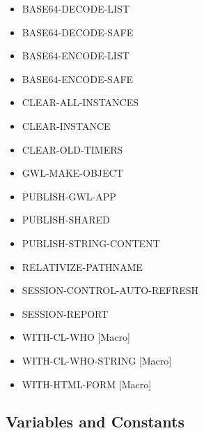 \documentclass [11pt]{book}
\begin{document}
\label{subsec:functionandmacrodefinitions}



\begin{itemize}

\item {}BASE64-DECODE-LIST

\item {}BASE64-DECODE-SAFE

\item {}BASE64-ENCODE-LIST

\item {}BASE64-ENCODE-SAFE

\item {}CLEAR-ALL-INSTANCES

\item {}CLEAR-INSTANCE

\item {}CLEAR-OLD-TIMERS

\item {}GWL-MAKE-OBJECT

\item {}PUBLISH-GWL-APP

\item {}PUBLISH-SHARED

\item {}PUBLISH-STRING-CONTENT

\item {}RELATIVIZE-PATHNAME

\item {}SESSION-CONTROL-AUTO-REFRESH

\item {}SESSION-REPORT

\item {}WITH-CL-WHO [Macro]

\item {}WITH-CL-WHO-STRING [Macro]

\item {}WITH-HTML-FORM [Macro]

\end{itemize}



\subsection{Variables and Constants}
\end{document}
